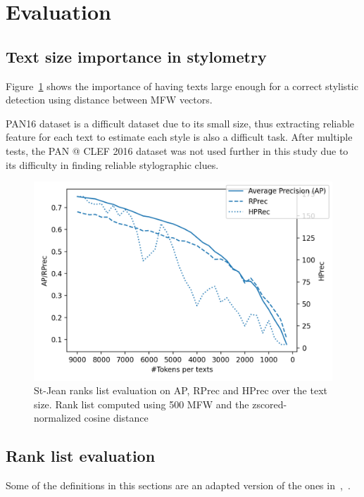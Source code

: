 \section{Evaluation}

\subsection{Text size importance in stylometry}

Figure~\ref{img:degradation} shows the importance of having texts large enough for a correct stylistic detection using distance between MFW vectors.

PAN16 dataset is a difficult dataset due to its small size, thus extracting reliable feature for each text to estimate each style is also a difficult task.
After multiple tests, the PAN @ CLEF 2016 dataset was not used further in this study due to its difficulty in finding reliable stylographic clues.

\begin{figure}
  \includegraphics[width=\linewidth]{img/degradation.png}
  \caption{St-Jean ranks list evaluation on AP, RPrec and HPrec over the text size. Rank list computed using 500 MFW and the zscored-normalized cosine distance}
  \label{img:degradation}
\end{figure}


\subsection{Rank list evaluation}

Some of the definitions in this sections are an adapted version of the ones in~\cite{kocher_linking},~\cite{bcubed}.

